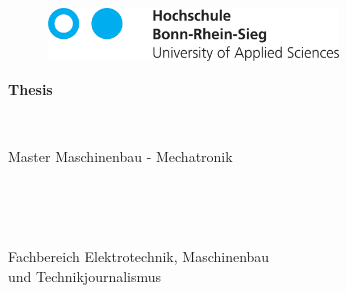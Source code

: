 \begin{titlepage}
	\begin{figure}[htbp]
		\includegraphics[height=1.4cm]{Kapitel/xx_Logo_HBRS_74mm_Pfade-eps-converted-to.pdf}
	\end{figure}
  \linespread{1.4}%
  \vspace{2cm}
  \begin{center}

    \begin{Huge}\textbf{Thesis}\end{Huge} \\
    \vspace{1.5cm}
    \begin{Large}{Master Maschinenbau - Mechatronik}\end{Large} \\

    \vspace{0.7cm}
    \linespread{1.2}%
    \begin{huge}
      \textbf{\Title}
    \end{huge}
    \linespread{1.5}%
    \normalsize
    \vspace{1cm}%

    \begin{Large}{\Author \\}
    \end{Large}

    \begin{Large}%
        Fachbereich Elektrotechnik, Maschinenbau \\ und Technikjournalismus
    \end{Large}
  \end{center}

\vspace*{\fill}


\end{titlepage}
